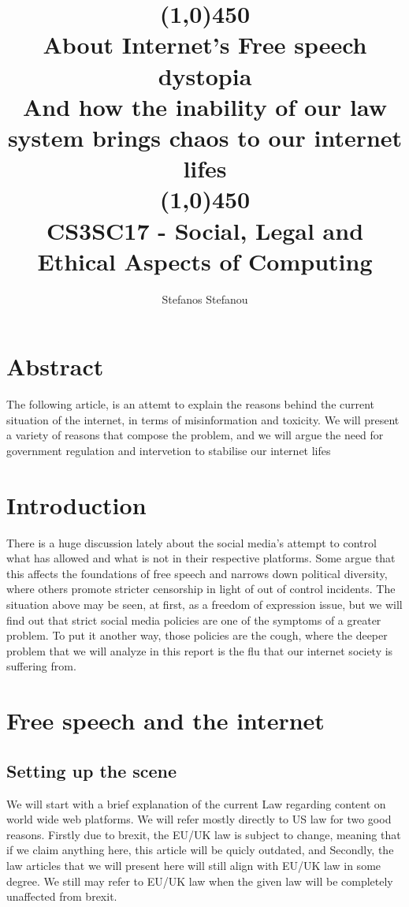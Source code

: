 \documentclass[openany]{article}
\title{\line(1,0){450}\\ About Internet's Free speech dystopia \\ \large{And how the inability of our law system brings chaos to our internet lifes}  \\\line(1,0){450} \\CS3SC17 - Social, Legal and Ethical Aspects of Computing }
\author{Stefanos Stefanou}
\begin{document}
	\maketitle
	\pagebreak
	
	\section*{Abstract}
	
		The following article, is an attemt to explain the reasons behind the current situation of the internet, in terms of misinformation
		and toxicity. We will present a variety of reasons that compose the problem, and we will argue the need for government regulation and
		intervetion to stabilise our internet lifes
		
	\section*{Introduction}		
		There is a huge discussion lately\cite{Disqussion-about-censorship-1,Disqussion-about-censorship-2} about the social media's 
		attempt to control what has allowed and what is not in their respective platforms. Some argue that this affects the foundations 
		of free speech and narrows down political diversity\cite{dystopians-1},	where others promote stricter censorship 
		in light of out of control incidents\cite{out-of-control}. The situation above may be seen, at first, as a freedom of expression issue, 
		but we will find out that strict social media policies are one of the symptoms of a greater problem. To put it another way, 
		those policies are the cough, where the deeper problem that we will analyze in this report is the flu that our internet society is suffering from.
	\section{Free speech and the internet}
	\subsection*{Setting up the scene}
		We will start with a brief explanation of the current Law regarding content on world wide web platforms. We will refer mostly
		directly to US law for two good reasons. Firstly due to brexit, the EU/UK law is subject to change, meaning that if we claim anything here, 
		this article will be quicly outdated, and Secondly, the law articles that we will present here will still align with EU/UK law in some degree.
		We still may refer to EU/UK law when the given law will be completely unaffected from brexit.
\end{document}
